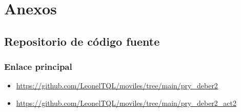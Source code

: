 \documentclass[12pt, a4paper]{article}
\begin{document}
\section{Anexos}
\subsection{Repositorio de código fuente}

\subsubsection{Enlace principal}
\begin{itemize}
  \item \url{https://github.com/LeonelTQL/moviles/tree/main/pry_deber2}
  \item \url{https://github.com/LeonelTQL/moviles/tree/main/pry_deber2_act2}
\end{itemize}
\end{document}
